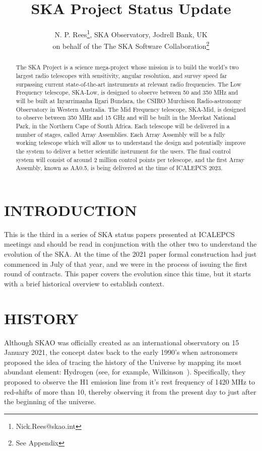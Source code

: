 \documentclass[a4paper,
               biblatex,     %
               keeplastbox,   %
               ]{jacow}
\begin{document}
\title{SKA Project Status Update}

\author{N. P. Rees\thanks{Nick.Rees@skao.int}, SKA Observatory, Jodrell Bank, UK\\
		on behalf of the The SKA Software Collaboration\thanks{See Appendix}}


\maketitle

%
\begin{abstract}
The SKA Project is a science mega-project whose mission is to build the world's two largest radio telescopes with sensitivity, angular resolution, and survey speed far surpassing current state-of-the-art instruments at relevant radio frequencies. The Low Frequency telescope, SKA-Low, is designed to observe between 50 and 350 MHz and will be built at Inyarrimanha Ilgari Bundara, the CSIRO Murchison Radio-astronomy Observatory in Western Australia. The Mid Frequency telescope, SKA-Mid, is designed to observe between 350 MHz and 15 GHz and will be built in the Meerkat National Park, in the Northern Cape of South Africa. Each telescope will be delivered in a number of stages, called Array Assemblies. Each Array Assembly will be a fully working telescope which will allow us to understand the design and potentially improve the system to deliver a better scientific instrument for the users. The final control system will consist of around 2 million control points per telescope, and the first Array Assembly, known as AA0.5, is being delivered at the time of ICALEPCS 2023.
\end{abstract}

\section{INTRODUCTION}
This is the third in a series of SKA status papers presented at ICALEPCS meetings and should be read in conjunction with the other two to understand the evolution of the SKA. At the time of the 2021 paper formal construction had just commenced in July of that year, and we were in the process of issuing the first round of contracts. This paper covers the evolution since this time, but it starts with a brief historical overview to establish context.

\section{HISTORY}
Although SKAO was officially created as an international observatory on 15 January 2021, the concept dates back to the early 1990's when astronomers proposed the idea of tracing the history of the Universe by mapping its most abundant element: Hydrogen (see, for example, Wilkinson~\cite{1991ASPC...19..428W}). Specifically, they proposed to observe the H1 emission line from it's rest frequency of 1420 MHz to red-shifts of more than 10, thereby observing it from the present day to just after the beginning of the universe.
\end{document}
